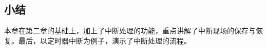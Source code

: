 \documentclass[main.tex]{subfiles}
\begin{document}
\begin{CJK*}{UTF8}{song}
\section{小结}
本章在第二章的基础上，加上了中断处理的功能，重点讲解了中断现场的保存与恢复。最后，以定时器中断为例子，演示了中断处理的流程。

\clearpage
\ifxetex\else\end{CJK*}\fi
\end{document}
